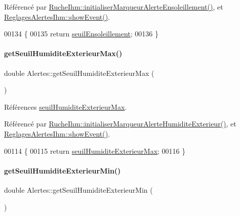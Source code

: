 Référencé par \hyperlink{class_ruche_ihm_a6d52dd904573d1bfc9551421ab53e8cc}{Ruche\+Ihm\+::initialiser\+Marqueur\+Alerte\+Ensoleillement()}, et \hyperlink{class_reglages_alertes_ihm_af47504b34ab0213fce9269c08b9e5544}{Reglages\+Alertes\+Ihm\+::show\+Event()}.


\begin{DoxyCode}
00134 \{
00135     \textcolor{keywordflow}{return} \hyperlink{class_alertes_a7f512b6d3b5bc0851757ab4d18279ccf}{seuilEnsoleillement};
00136 \}
\end{DoxyCode}
\mbox{\label{class_alertes_ad2c8daf5668f5d122efb9b84f7ea86de}} 
\paragraph{\texorpdfstring{get\+Seuil\+Humidite\+Exterieur\+Max()}{getSeuilHumiditeExterieurMax()}}
{\footnotesize\ttfamily double Alertes\+::get\+Seuil\+Humidite\+Exterieur\+Max (\begin{DoxyParamCaption}{ }\end{DoxyParamCaption})}



Références \hyperlink{class_alertes_afa54793d1f47a97894faf91e76fb2a04}{seuil\+Humidite\+Exterieur\+Max}.



Référencé par \hyperlink{class_ruche_ihm_ae572f3f2b76e8c9b14a699d3e29422ee}{Ruche\+Ihm\+::initialiser\+Marqueur\+Alerte\+Humidite\+Exterieur()}, et \hyperlink{class_reglages_alertes_ihm_af47504b34ab0213fce9269c08b9e5544}{Reglages\+Alertes\+Ihm\+::show\+Event()}.


\begin{DoxyCode}
00114 \{
00115     \textcolor{keywordflow}{return} \hyperlink{class_alertes_afa54793d1f47a97894faf91e76fb2a04}{seuilHumiditeExterieurMax};
00116 \}
\end{DoxyCode}
\mbox{\label{class_alertes_a68e467e042b615f56347a0953d6e64f1}} 
\paragraph{\texorpdfstring{get\+Seuil\+Humidite\+Exterieur\+Min()}{getSeuilHumiditeExterieurMin()}}
{\footnotesize\ttfamily double Alertes\+::get\+Seuil\+Humidite\+Exterieur\+Min (\begin{DoxyParamCaption}{ }\end{DoxyParamCaption})}



